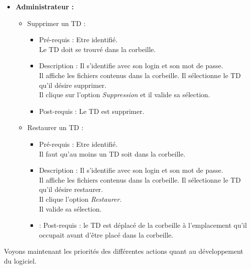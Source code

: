 	\begin{itemize}
	\item {\bf Administrateur :}\\
		\begin{itemize}
		\item Supprimer un TD :
			\begin{itemize}
			\item Pr{\'e}-requis : Etre identifi{\'e}.\\
			Le TD doit se trouv{\'e} dans la corbeille.
			\item Description : Il s'identifie avec son login et son mot de passe.\\
			Il affiche les fichiers contenus dans la corbeille. Il s{\'e}lectionne le TD qu'il d{\'e}sire supprimer.\\
			Il clique sur l'option {\it Suppression} et il valide sa s{\'e}lection.
			\item Post-requis : Le TD est supprimer.\\
			\end{itemize}

		\item Restaurer un TD :
			\begin{itemize}
			\item Pr{\'e}-requis : Etre identifi{\'e}.\\
			Il faut qu'au moins un TD soit dans la corbeille.
			\item Description : Il s'identifie avec son login et son mot de passe.\\
			Il affiche les fichiers contenus dans la corbeille. Il s{\'e}lectionne le TD qu'il d{\'e}sire restaurer.\\
			Il clique l'option {\it Restaurer}.\\
			Il valide sa s{\'e}lection.
			\item : Post-requis : le TD est d{\'e}plac{\'e} de la corbeille {\`a} l'emplacement qu'il occupait avant d'{\^e}tre plac{\'e} dans la corbeille.\\
			\end{itemize}
		\end{itemize}
	\end{itemize}

Voyons maintenant les priorit{\'e}s des diff{\'e}rentes actions quant au
d{\'e}veloppement du logiciel.\\\\\\

